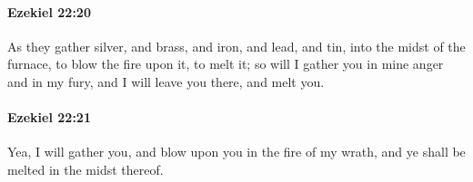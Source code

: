 		\paragraph{Ezekiel 22:20} %
			\label{EZEKIEL-22-20}

			As they gather silver, and brass, and iron, and lead, and tin, into the midst of the furnace, to blow the fire upon it, to melt it; so will I gather you in mine anger and in my fury, and I will leave you there, and melt you.


		\paragraph{Ezekiel 22:21} %
			\label{EZEKIEL-22-21}

			Yea, I will gather you, and blow upon you in the fire of my wrath, and ye shall be melted in the midst thereof.


